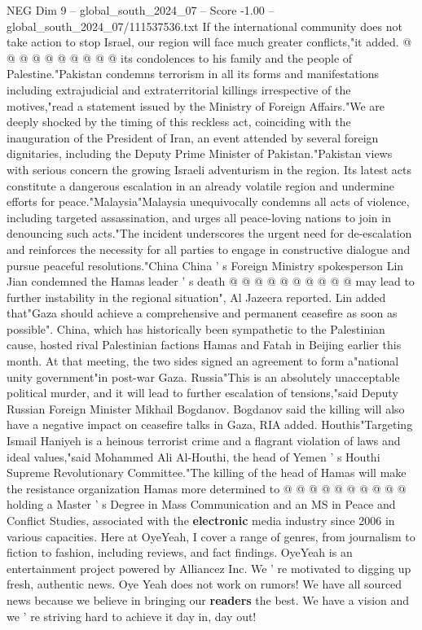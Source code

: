 \begin{textsample}{NEG Dim 9 – global\_south\_2024\_07 – Score -1.00 – global\_south\_2024\_07/111537536.txt}
If the international community does not take action to stop Israel, our region will face much greater conflicts,"it added. @ @ @ @ @ @ @ @ @ @ its condolences to his family and the people of Palestine."Pakistan condemns terrorism in all its forms and manifestations including extrajudicial and extraterritorial killings irrespective of the motives,"read a statement issued by the Ministry of Foreign Affairs."We are deeply shocked by the timing of this reckless act, coinciding with the inauguration of the President of Iran, an event attended by several foreign dignitaries, including the Deputy Prime Minister of Pakistan."Pakistan views with serious concern the growing Israeli adventurism in the region.
Its latest acts constitute a dangerous escalation in an already volatile region and undermine efforts for peace."Malaysia"Malaysia unequivocally condemns all acts of violence, including targeted assassination, and urges all peace-loving nations to join in denouncing such acts."The incident underscores the urgent need for de-escalation and reinforces the necessity for all parties to engage in constructive dialogue and pursue peaceful resolutions."China China ' s Foreign Ministry spokesperson Lin Jian condemned the Hamas leader ' s death @ @ @ @ @ @ @ @ @ @ may lead to further instability in the regional situation", Al Jazeera reported.
Lin added that"Gaza should achieve a comprehensive and permanent ceasefire as soon as possible".
China, which has historically been sympathetic to the Palestinian cause, hosted rival Palestinian factions Hamas and Fatah in Beijing earlier this month.
At that meeting, the two sides signed an agreement to form a"national unity government"in post-war Gaza.
Russia"This is an absolutely unacceptable political murder, and it will lead to further escalation of tensions,"said Deputy Russian Foreign Minister Mikhail Bogdanov.
Bogdanov said the killing will also have a negative impact on ceasefire talks in Gaza, RIA added.
Houthis"Targeting Ismail Haniyeh is a heinous terrorist crime and a flagrant violation of laws and ideal values,"said Mohammed Ali Al-Houthi, the head of Yemen ' s Houthi Supreme Revolutionary Committee."The killing of the head of Hamas will make the resistance organization Hamas more determined to @ @ @ @ @ @ @ @ @ @ holding a Master ' s Degree in Mass Communication and an MS in Peace and Conflict Studies, associated with the \textbf{electronic} media industry since 2006 in various capacities.
Here at OyeYeah, I cover a range of genres, from journalism to fiction to fashion, including reviews, and fact findings.
OyeYeah is an entertainment project powered by Alliancez Inc.
We ' re motivated to digging up fresh, authentic news.
Oye Yeah does not work on rumors!
We have all sourced news because we believe in bringing our \textbf{readers} the best.
We have a vision and we ' re striving hard to achieve it day in, day out!

\end{textsample}
